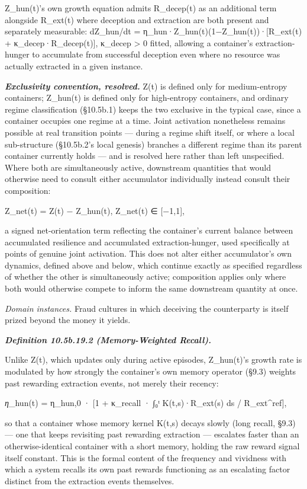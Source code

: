\documentclass[
]{article}
\begin{document}
Z\_hun(t)'s own growth equation admits R\_decep(t) as an additional term
alongside R\_ext(t) where deception and extraction are both present and
separately measurable: dZ\_hun/dt =
η\_hun·Z\_hun(t)(1−Z\_hun(t))·{[}R\_ext(t) + κ\_decep·R\_decep(t){]},
κ\_decep \textgreater{} 0 fitted, allowing a container's
extraction-hunger to accumulate from successful deception even where no
resource was actually extracted in a given instance.

\emph{\textbf{Exclusivity convention, resolved.}} Z(t) is defined only
for medium-entropy containers; Z\_hun(t) is defined only for
high-entropy containers, and ordinary regime classification (§10.5b.1)
keeps the two exclusive in the typical case, since a container occupies
one regime at a time. Joint activation nonetheless remains possible at
real transition points --- during a regime shift itself, or where a
local sub-structure (§10.5b.2's local genesis) branches a different
regime than its parent container currently holds --- and is resolved
here rather than left unspecified. Where both are simultaneously active,
downstream quantities that would otherwise need to consult either
accumulator individually instead consult their composition:

Z\_net(t) = Z(t) − Z\_hun(t), Z\_net(t) ∈ {[}−1,1{]},

a signed net-orientation term reflecting the container's current balance
between accumulated resilience and accumulated extraction-hunger, used
specifically at points of genuine joint activation. This does not alter
either accumulator's own dynamics, defined above and below, which
continue exactly as specified regardless of whether the other is
simultaneously active; composition applies only where both would
otherwise compete to inform the same downstream quantity at once.

\emph{Domain instances.} Fraud cultures in which deceiving the
counterparty is itself prized beyond the money it yields.

\emph{\textbf{Definition 10.5b.19.2 (Memory-Weighted Recall).}}

Unlike Z(t), which updates only during active episodes, Z\_hun(t)'s
growth rate is modulated by how strongly the container's own memory
operator (§9.3) weights past rewarding extraction events, not merely
their recency:

\emph{η}\_hun(t) = η\_hun,0 · {[}1 + κ\_recall · ∫₀ᵗ K(t,s)·R\_ext(s) ds
/ R\_ext\^{}ref{]},

so that a container whose memory kernel K(t,s) decays slowly (long
recall, §9.3) --- one that keeps revisiting past rewarding extraction
--- escalates faster than an otherwise-identical container with a short
memory, holding the raw reward signal itself constant. This is the
formal content of the frequency and vividness with which a system
recalls its own past rewards functioning as an escalating factor
distinct from the extraction events themselves.
\end{document}
